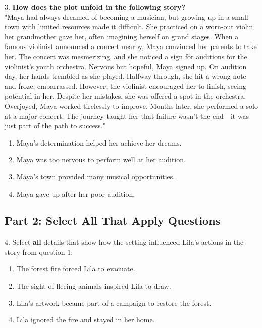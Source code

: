 \documentclass[12pt]{article}
\begin{document}
3. \textbf{How does the plot unfold in the following story?\\}
"Maya had always dreamed of becoming a musician, but growing up in a small town with limited resources made it difficult. She practiced on a worn-out violin her grandmother gave her, often imagining herself on grand stages. When a famous violinist announced a concert nearby, Maya convinced her parents to take her. The concert was mesmerizing, and she noticed a sign for auditions for the violinist’s youth orchestra. Nervous but hopeful, Maya signed up. On audition day, her hands trembled as she played. Halfway through, she hit a wrong note and froze, embarrassed. However, the violinist encouraged her to finish, seeing potential in her. Despite her mistakes, she was offered a spot in the orchestra. Overjoyed, Maya worked tirelessly to improve. Months later, she performed a solo at a major concert. The journey taught her that failure wasn’t the end—it was just part of the path to success."  
\begin{enumerate}[label=\Alph*.]
    \item Maya’s determination helped her achieve her dreams.  
    \item Maya was too nervous to perform well at her audition.  
    \item Maya’s town provided many musical opportunities.  
    \item Maya gave up after her poor audition.  
\end{enumerate}

\vspace{1cm}

\subsection*{Part 2: Select All That Apply Questions}

4. Select \textbf{all} details that show how the setting influenced Lila’s actions in the story from question 1:  
\begin{enumerate}[label=\Alph*.]
    \item The forest fire forced Lila to evacuate.  
    \item The sight of fleeing animals inspired Lila to draw.  
    \item Lila’s artwork became part of a campaign to restore the forest.  
    \item Lila ignored the fire and stayed in her home.  
\end{enumerate}
\end{document}
